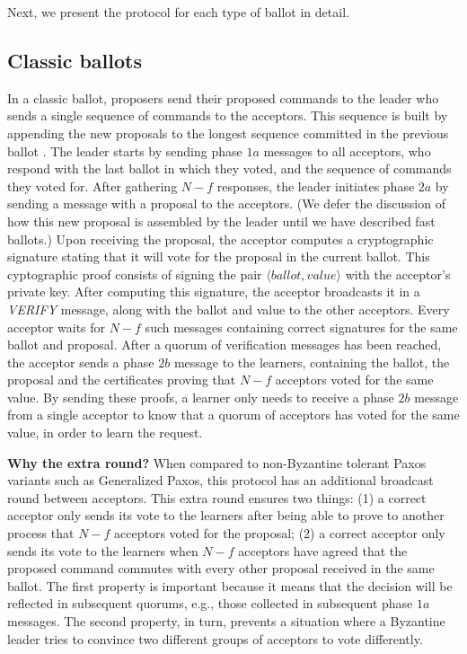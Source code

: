 Next, we present the protocol for each type of ballot in detail.

\subsection{Classic ballots} 

In a classic ballot, proposers send their proposed commands to the leader who sends a single sequence of commands to the acceptors. This sequence is built by appending the new proposals to the longest sequence committed in the previous ballot . The leader starts by sending phase $1a$ messages to all acceptors, who respond with the last ballot in which they voted, and the sequence of commands they voted for.
After gathering $N-f$ responses, the leader initiates phase $2a$ by sending a message with a proposal to the acceptors. (We defer the discussion of how this new proposal is assembled by the leader until we have described fast ballots.) Upon receiving the proposal, the acceptor computes a cryptographic signature stating that it will vote for the proposal in the current ballot. This cyptographic proof consists of signing the pair $\langle ballot,value \rangle$ with the acceptor's private key. After computing this signature, the acceptor broadcasts it in a {\em VERIFY} message, along with the ballot and value to the other acceptors. Every acceptor waits for $N-f$ such messages containing correct signatures for the same ballot and proposal. After a quorum of verification messages has been reached, the acceptor sends a phase $2b$ message to the learners, containing the ballot, the proposal and the certificates proving that $N-f$ acceptors voted for the same value. By sending these proofs, a learner only needs to receive a phase $2b$ message from a single acceptor to know that a quorum of acceptors has voted for the same value, in order to learn the request.

\textbf{Why the extra round?} When compared to non-Byzantine tolerant Paxos variants such as Generalized Paxos, this protocol has an additional broadcast round between acceptors. This extra round ensures two things: (1) a correct acceptor only sends its vote to the learners after being able to prove to another process that $N-f$ acceptors voted for the proposal; (2) a correct acceptor only sends its vote to the learners when $N-f$ acceptors have agreed that the proposed command commutes with every other proposal received in the same ballot. The first property is important because it means that the decision will be reflected in subsequent quorums, e.g., those collected in subsequent phase $1a$ messages. The second property, in turn, prevents a situation where a Byzantine leader tries to convince two different groups of acceptors to vote differently. 


